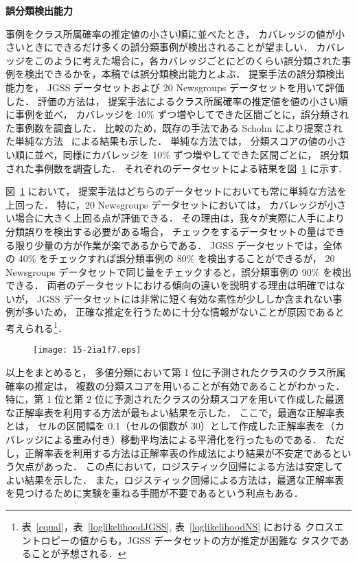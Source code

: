 \documentclass[japanese]{jnlp_1.4}
\begin{document}
\vspace{1\baselineskip}
\noindent
{\bf 誤分類検出能力} 

事例をクラス所属確率の推定値の小さい順に並べたとき，
カバレッジの値が小さいときにできるだけ多くの誤分類事例が検出されることが望ましい．
カバレッジをこのように考えた場合に，各カバレッジごとにどのくらい誤分類された事例を検出できるかを，本稿では誤分類検出能力とよぶ．
提案手法の誤分類検出能力を，
JGSS データセットおよび 20 Newsgroups データセットを用いて評価した．
評価の方法は，
提案手法によるクラス所属確率の推定値を値の小さい順に事例を並べ，
カバレッジを 10\% ずつ増やしてできた区間ごとに，誤分類された事例数を調査した．
比較のため，既存の手法である Schohn により提案された単純な方法~\cite{Schohn00} による結果も示した．
単純な方法では，
分類スコアの値の小さい順に並べ，同様にカバレッジを 10\% ずつ増やしてできた区間ごとに，
誤分類された事例数を調査した．
それぞれのデータセットによる結果を図~\ref{Lap-RawJGSS_ns} に示す．
 
図~\ref{Lap-RawJGSS_ns} において，
提案手法はどちらのデータセットにおいても常に単純な方法を上回った．
特に，20 Newsgroups データセットにおいては，
カバレッジが小さい場合に大きく上回る点が評価できる．
その理由は，我々が実際に人手により分類誤りを検出する必要がある場合，
チェックをするデータセットの量はできる限り少量の方が作業が楽であるからである．
JGSS データセットでは，全体の 40\% をチェックすれば誤分類事例の 80\% を検出することができるが，
20 Newsgroups データセットで同じ量をチェックすると，誤分類事例の 90\% を検出できる．
両者のデータセットにおける傾向の違いを説明する理由は明確ではないが，
JGSS データセットには非常に短く有効な素性が少ししか含まれない事例が多いため，
正確な推定を行うために十分な情報がないことが原因であると考えられる\footnote{
	表~\ref{equal}，表~\ref{loglikelihoodJGSS}, 表~\ref{loglikelihoodNS} における
	クロスエントロピーの値からも，JGSS データセットの方が推定が困難な
	タスクであることが予想される．
}．

\begin{figure}[t]
\begin{center}
\texttt{[image: 15-2ia1f7.eps]}
\label{Lap-RawJGSS_ns}
\end{center}
\end{figure}

以上をまとめると，
多値分類において第 1 位に予測されたクラスのクラス所属確率の推定は，
複数の分類スコアを用いることが有効であることがわかった．
特に，第 1 位と第 2 位に予測されたクラスの分類スコアを用いて作成した最適な正解率表を利用する方法が最もよい結果を示した．
ここで，最適な正解率表とは，
セルの区間幅を 0.1（セルの個数が 30）として作成した正解率表を（カバレッジによる重み付き）移動平均法による平滑化を行ったものである．
ただし，正解率表を利用する方法は正解率表の作成法により結果が不安定であるという欠点があった．
この点において，ロジスティック回帰による方法は安定してよい結果を示した．
また，ロジスティック回帰による方法は，最適な正解率表を見つけるために実験を重ねる手間が不要であるという利点もある．
\end{document}
